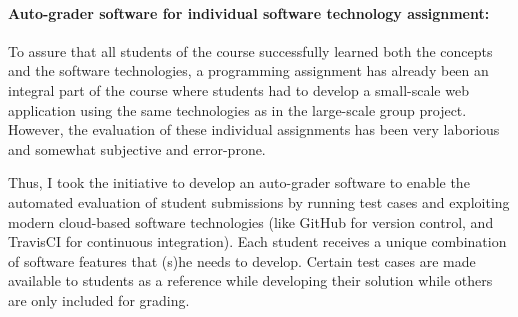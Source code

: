 


\paragraph{Auto-grader software for individual software technology assignment:}
To assure that all students of the course successfully learned both the concepts and the software technologies, a programming assignment has already been an integral part of the course where students had to develop a small-scale web application using the same technologies as in the large-scale group project. However, the evaluation of these individual assignments has been very laborious and somewhat subjective and error-prone. 


Thus, I took the initiative to develop an auto-grader software to enable the automated evaluation of student submissions by running test cases and exploiting modern cloud-based software technologies (like GitHub for version control, and TravisCI for continuous integration). Each student receives a unique combination of software features that (s)he needs to develop. Certain test cases are made available to students as a reference while developing their solution while others are only included for grading. 

